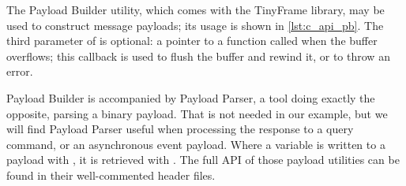 The Payload Builder utility, which comes with the TinyFrame library, may be used to construct message payloads; its usage is shown in \cref{lst:c_api_pb}. The third parameter of  is optional: a pointer to a function called when the buffer overflows; this callback is used to flush the buffer and rewind it, or to throw an error.

Payload Builder is accompanied by Payload Parser, a tool doing exactly the opposite, parsing a binary payload. That is not needed in our example, but we will find Payload Parser useful when processing the response to a query command, or an asynchronous event payload. Where a variable is written to a payload with , it is retrieved with . The full API of those payload utilities can be found in their well-commented header files.


